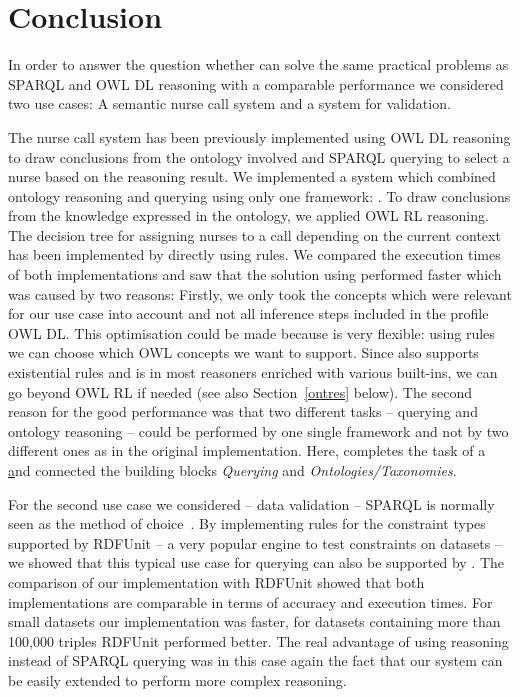 \section{Conclusion}
In order to answer the question whether \nthreelogic can solve the same practical problems as SPARQL and OWL DL reasoning with a comparable performance we considered two use cases:
A semantic nurse call system and a system for \rdf validation.  

The nurse call system has been previously implemented using OWL DL reasoning to draw conclusions from the ontology involved
and SPARQL querying to select a nurse based on the reasoning 
result. 
We implemented a system which combined ontology reasoning and querying using only one framework: \nthreelogic. To draw conclusions from 
the knowledge expressed in the ontology, we applied OWL RL reasoning. 
The decision tree
for assigning nurses to a call depending on the current context has been implemented by directly using \nthree rules. 
We compared the execution times of both implementations and saw that the solution using \nthree performed faster which was caused by two reasons:
Firstly, we only took the \owl concepts which were relevant for our use case into account and not all inference steps included in the profile OWL DL. 
This optimisation could be made because \nthreelogic is very flexible: using rules we can choose which OWL concepts we want to support. 
Since \nthree also supports existential rules and is in most reasoners enriched with various built-ins, we can go beyond OWL RL if needed 
(see also Section~\ref{ontres} below).
The second reason for the good performance was that two different tasks -- querying and ontology reasoning -- could be performed by one single framework and
not by two 
different ones as in the original implementation. Here, \nthree completes the task of a \ul and connected the building blocks \emph{Querying} and 
\emph{Ontologies/Taxonomies}.

For the second use case  we considered -- \rdf data validation -- SPARQL is normally seen as the method of choice~\cite[p. 143]{hartmann2016}. By implementing 
rules for the constraint types supported by RDFUnit -- a very popular engine to test constraints on \rdf datasets -- 
we showed that this typical use case for querying 
can also be supported by \nthreelogic. The comparison of our implementation with RDFUnit showed that both implementations are comparable in terms of accuracy and 
execution times. For small datasets our implementation was faster, for datasets containing more than 100,000 triples RDFUnit performed better.
The real advantage of using \nthree reasoning instead of SPARQL querying was in this case again the fact that our system can be easily extended to perform more complex 
reasoning.

